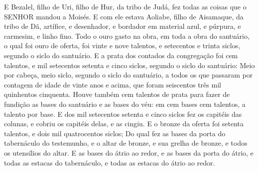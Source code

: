 {E Bezalel, filho de Uri, filho de Hur, da tribo de Judá, fez todas as coisas que o SENHOR mandou a Moisés.
E com ele estava Aoliabe, filho de Aisamaque, da tribo de Dã, artífice, e desenhador, e bordador em material azul, e púrpura, e carmesim, e linho fino.
Todo o ouro gasto na obra, em toda a obra do santuário, o qual foi ouro de oferta, foi vinte e nove talentos, e setecentos e trinta siclos, segundo o siclo do santuário.
E a prata dos contados da congregação foi cem talentos, e mil setecentos setenta e cinco siclos, segundo o siclo do santuário:
Meio por cabeça, meio siclo, segundo o siclo do santuário, a todos os que passaram por contagem de idade de vinte anos e acima, que foram seiscentos três mil quinhentos cinquenta.
Houve também cem talentos de prata para fazer de fundição as bases do santuário e as bases do véu: em cem bases cem talentos, a talento por base.
E dos mil setecentos setenta e cinco siclos fez os capitéis das colunas, e cobriu os capitéis delas, e as cingiu.
E o bronze da oferta foi setenta talentos, e dois mil quatrocentos siclos;
Do qual fez as bases da porta do tabernáculo do testemunho, e o altar de bronze, e sua grelha de bronze, e todos os utensílios do altar.
E as bases do átrio ao redor, e as bases da porta do átrio, e todas as estacas do tabernáculo, e todas as estacas do átrio ao redor.

}
